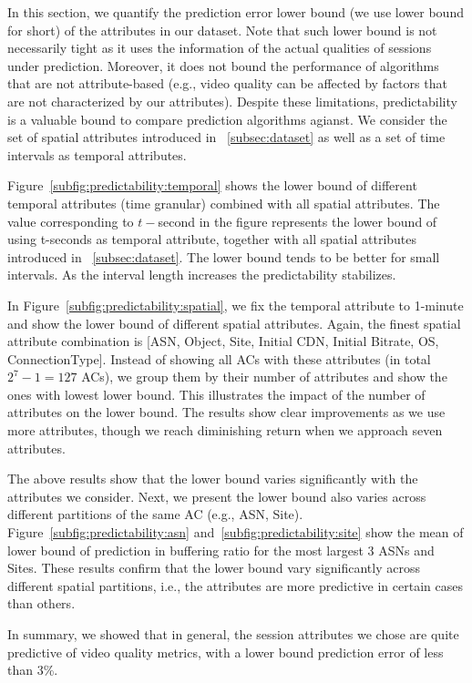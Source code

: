 

In this section, we quantify the prediction error lower bound (we use lower bound for short) of the attributes in our dataset. Note that such lower bound is not necessarily tight as it uses the information of the actual qualities of sessions under prediction. Moreover, it does not bound the performance of algorithms that are not attribute-based (e.g., video quality can be affected by factors that are not characterized by our attributes).
Despite these limitations, predictability is a valuable bound to compare prediction algorithms agianst. We consider the set of spatial attributes introduced in \Section~\ref{subsec:dataset} as well as a set of time intervals as temporal attributes.

 Figure~\ref{subfig:predictability:temporal} shows the lower bound of different temporal attributes (time granular) combined with all spatial attributes. The value corresponding to $t-$second in the figure represents the lower bound of using t-seconds as temporal attribute, together with all spatial attributes introduced in \Section~\ref{subsec:dataset}. The lower bound tends to be better for small intervals. As the interval length increases the predictability stabilizes. 

 In Figure~\ref{subfig:predictability:spatial}, we fix the temporal attribute to 1-minute and show the lower bound of different spatial attributes. Again, the finest spatial attribute combination is [ASN, Object, Site, Initial CDN, Initial Bitrate, OS, ConnectionType].  Instead of showing all ACs with these attributes (in total $2^7-1=127$ ACs), we group them by their number of attributes and show the ones with lowest lower bound. This illustrates the impact of the number of attributes on the lower bound. The results show clear improvements as we use more attributes, though we reach diminishing return when we approach seven attributes.

 The above results show that the lower bound varies significantly with the attributes we consider. Next, we present the lower bound also varies across different partitions of the same AC (e.g., ASN, Site). Figure~\ref{subfig:predictability:asn} and~\ref{subfig:predictability:site} show the mean of lower bound of prediction in buffering ratio for the most largest 3 ASNs and Sites. These results confirm that the lower bound vary significantly across different spatial partitions, i.e., the attributes are more predictive in certain cases than others. %

In summary, we showed that in general, the session attributes we chose are quite predictive of video quality metrics, with a lower bound prediction error of less than 3\%.


